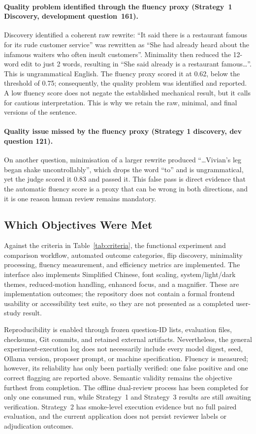 \documentclass[11pt,a4paper]{article}
\begin{document}
\paragraph{Quality problem identified through the fluency proxy (Strategy~1
Discovery, development question~161).}
Discovery identified a coherent raw rewrite: ``It said there is a restaurant famous
for its rude customer service'' was rewritten as ``She had already heard about the
infamous waiters who often insult customers''. Minimality then reduced the 12-word
edit to just 2 words, resulting in ``She said already is a restaurant famous\ldots''.
This is ungrammatical English. The fluency proxy scored it at 0.62, below the
threshold of 0.75; consequently, the quality problem was identified and reported.
A low fluency score does not negate the established mechanical result, but it calls
for cautious interpretation. This is why we retain the raw, minimal, and final
versions of the sentence.

\paragraph{Quality issue missed by the fluency proxy (Strategy 1 discovery, dev
question 121).}
On another question, minimisation of a larger rewrite produced ``\ldots Vivian's leg
began shake uncontrollably'', which drops the word ``to'' and is ungrammatical, yet
the judge scored it 0.83 and passed it. This false pass is direct evidence that the
automatic fluency score is a proxy that can be wrong in both directions, and it is one
reason human review remains mandatory.

\subsection{Which Objectives Were Met}

Against the criteria in Table~\ref{tab:criteria}, the functional experiment and
comparison workflow, automated outcome categories, flip discovery, minimality
processing, fluency measurement, and efficiency metrics are implemented. The
interface also implements Simplified Chinese, font scaling, system/light/dark themes,
reduced-motion handling, enhanced focus, and a magnifier. These are implementation
outcomes; the repository does not contain a formal frontend usability or accessibility
test suite, so they are not presented as a completed user-study result.

Reproducibility is enabled through frozen question-ID lists, evaluation files,
checksums, Git commits, and retained external artifacts. Nevertheless, the general
experiment-execution log does not necessarily include every model digest, seed, Ollama
version, proposer prompt, or machine specification. Fluency is measured; however,
its reliability has only been partially verified: one false positive and one correct
flagging are reported above. Semantic validity remains the objective furthest from
completion. The offline dual-review process has been completed for only one consumed
run, while Strategy~1 and Strategy~3 results are still awaiting verification.
Strategy~2 has smoke-level execution evidence but no full paired evaluation, and the
current application does not persist reviewer labels or adjudication outcomes.
\end{document}
